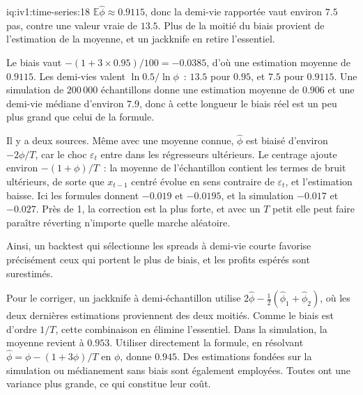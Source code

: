 \begin{solution}{iq:iv1:time-series:18}
$\mathbb{E}\hat{\phi} \approx 0.9115$, donc la demi-vie rapportée vaut environ $7.5$ pas, contre une valeur vraie de $13.5$. Plus de la moitié du biais provient de l'estimation de la moyenne, et un jackknife en retire l'essentiel.

Le biais vaut $-(1 + 3 \times 0.95)/100 = -0.0385$, d'où une estimation moyenne de $0.9115$. Les demi-vies valent $\ln 0.5/\ln\phi$~: $13.5$ pour $0.95$, et $7.5$ pour $0.9115$. Une simulation de $200\,000$ échantillons donne une estimation moyenne de $0.906$ et une demi-vie médiane d'environ $7.9$, donc à cette longueur le biais réel est un peu plus grand que celui de la formule.

Il y a deux sources. Même avec une moyenne connue, $\hat{\phi}$ est biaisé d'environ $-2\phi/T$, car le choc $\varepsilon_t$ entre dans les régresseurs ultérieurs. Le centrage ajoute environ $-(1 + \phi)/T$~: la moyenne de l'échantillon contient les termes de bruit ultérieurs, de sorte que $x_{t - 1}$ centré évolue en sens contraire de $\varepsilon_t$, et l'estimation baisse. Ici les formules donnent $-0.019$ et $-0.0195$, et la simulation $-0.017$ et $-0.027$. Près de 1, la correction est la plus forte, et avec un $T$ petit elle peut faire paraître réverting n'importe quelle marche aléatoire.

Ainsi, un backtest qui sélectionne les spreads à demi-vie courte favorise précisément ceux qui portent le plus de biais, et les profits espérés sont surestimés.

Pour le corriger, un jackknife à demi-échantillon utilise $2\hat{\phi} - \frac12(\hat{\phi}_1 + \hat{\phi}_2)$, où les deux dernières estimations proviennent des deux moitiés. Comme le biais est d'ordre $1/T$, cette combinaison en élimine l'essentiel. Dans la simulation, la moyenne revient à $0.953$. Utiliser directement la formule, en résolvant $\hat{\phi} = \phi - (1 + 3\phi)/T$ en $\phi$, donne $0.945$. Des estimations fondées sur la simulation ou médianement sans biais sont également employées. Toutes ont une variance plus grande, ce qui constitue leur coût.



\end{solution}

